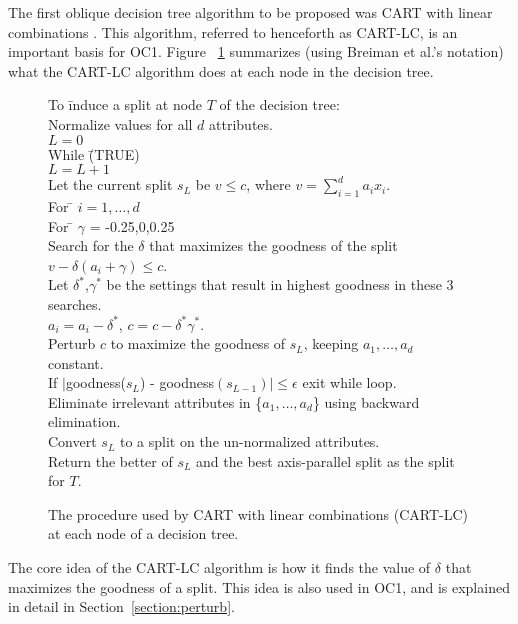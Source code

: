 The first oblique decision tree algorithm to be proposed was CART with
linear combinations \cite[chapter 5]{breiman/etal/84}.  This
algorithm, referred to henceforth as CART-LC, is an important basis
for OC1. Figure ~\ref{figure:cart-lc} summarizes (using Breiman et al.'s
notation) what the CART-LC algorithm does at each node in the decision
tree.
\begin{figure}
{\small
{\bf
\begin{tabbing}
To \= induce a split at node $T$ of the decision tree:\\
     \> Normalize values for all $d$ attributes.\\
     \> $L = 0$\\
     \> While \= (TRUE)\\
     \>    \> $L = L+1$ \\
     \>    \> Let the current split $s_L$ be $v \leq c$, where \( v = \sum_{i=1}^{d} {a_ix_i} \).\\
     \>    \> For \= $i = 1,\dots,d$\\
     \>    \>     \> For \= $\gamma$ = -0.25,0,0.25 \\
     \>    \>     \>     \> Search for the $\delta$ that maximizes the goodness of the split $v - \delta(a_i + \gamma) \leq c$. \\
     \>    \>     \> Let $\delta^*$,$\gamma^*$ be the settings that result in highest goodness in these 3 searches.\\
     \>    \>     \> $a_i = a_i - \delta^*$, $c = c - \delta^*\gamma^*$.\\
     \>    \> Perturb $c$ to maximize the goodness of $s_L$, keeping $a_1,\ldots,a_d$ constant.\\
     \>    \> If $|$goodness($s_L$) - goodness$(s_{L-1})| \leq \epsilon$ exit while loop.\\
     \> Eliminate irrelevant attributes in \{$a_1,\ldots,a_d$\} using backward elimination.\\
     \> Convert $s_L$ to a split on the un-normalized attributes. \\
     \> Return the better of $s_L$ and the best axis-parallel split as 
the split for $T$.
\end{tabbing}
}
}
\caption{The procedure used by CART with linear combinations (CART-LC) at
each node of a decision tree.}
\label{figure:cart-lc}
\end{figure}
The core idea of the CART-LC algorithm is how it finds the value of
$\delta$ that maximizes the goodness of a split.  This idea is also used
in OC1, and is explained in detail in Section~\ref{section:perturb}.

